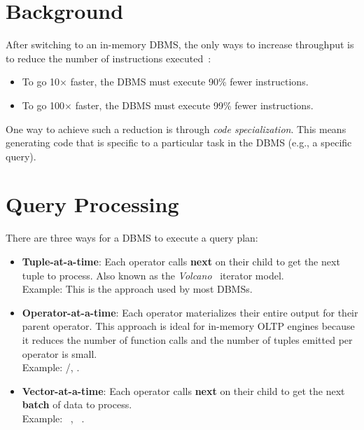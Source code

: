 \documentclass[11pt]{article}
\begin{document}
\maketitle
\thispagestyle{plain}

\section{Background}
After switching to an in-memory DBMS, the only ways to increase throughput is to reduce the 
number of instructions executed~\cite{freedman14}:
\begin{itemize}
    \item
    To go 10$\times$ faster, the DBMS must execute 90\% fewer instructions.
    
    \item
    To go 100$\times$ faster, the DBMS must execute 99\% fewer instructions.
\end{itemize}
    
One way to achieve such a reduction is through \textit{code specialization}. This means generating 
code that is specific to a particular task in the DBMS (e.g., a specific query).

\section{Query Processing}
There are three ways for a DBMS to execute a query plan:
\begin{itemize}
    \item \textbf{Tuple-at-a-time}:
    Each operator calls \textbf{next} on their child to get the next tuple to process. 
    Also known as the \textit{Volcano}~\cite{graefe94} iterator model. \\
    Example: This is the approach used by most DBMSs.
    
    \item \textbf{Operator-at-a-time}:
    Each operator materializes their entire output for their parent operator.
    This approach is ideal for in-memory OLTP engines because it reduces the number of function 
    calls and the number of tuples emitted per operator is small. \\
    Example: /, .
    
    \item \textbf{Vector-at-a-time}:
    Each operator calls \textbf{next} on their child to get the next \textbf{batch} of data to 
    process. \\
    Example: ~\cite{bonc05}, ~\cite{menon17}.
\end{itemize}
    
\end{document}
